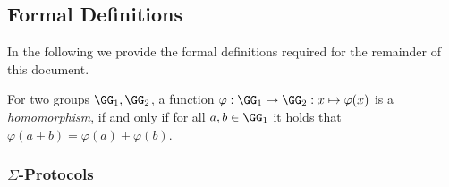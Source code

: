 \documentclass[runningheads]{llncs}
\begin{document}
\subsection{Formal Definitions}
  In the following we provide the formal definitions required for the remainder of this document.

\begin{definition}
  For two groups $\GG_1,\GG_2$, a function $\varphi:\GG_1\to\GG_2:x\mapsto\varphi(x)$ is a \emph{homomorphism}, if and only if for all $a,b\in\GG_1$ it holds that $\varphi(a+b)=\varphi(a)+\varphi(b)$.
\end{definition}


\subsubsection{$\Sigma$-Protocols}~\\
\end{document}
